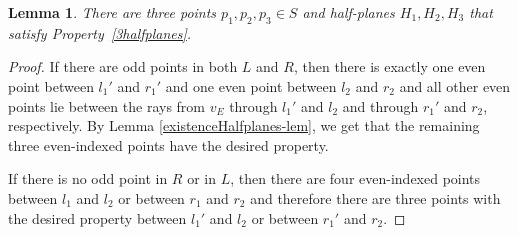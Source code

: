 \documentclass[11pt]{article}
\newtheorem{lemma}{Lemma}
\begin{document}
 \begin{lemma}
 There are three points $p_1,p_2,p_3\in S$ and half-planes $H_{1},H_{2},H_{3}$ that satisfy Property~\ref{3halfplanes}.
 \end{lemma}
\begin{proof}
 If there are odd points in both $L$ and $R$, then there is exactly one even point between $l_1'$ and $r_1'$ and one even point 
 between $l_2$ and $r_2$ and all other even points lie between the rays from $v_E$ through $l_1'$ and $l_2$ and through $r_1'$ and $r_2$, respectively. By Lemma \ref{existenceHalfplanes-lem}, we get that the remaining three even-indexed points have the desired property.
 
 If there is no odd point in $R$ or in $L$, then there are four even-indexed points between $l_1$ and $l_2$ or between $r_1$ and $r_2$ and therefore there are three points with the desired property between $l_1'$ and $l_2$ or between $r_1'$ and $r_2$.
 \end{proof}
 
\end{document}
